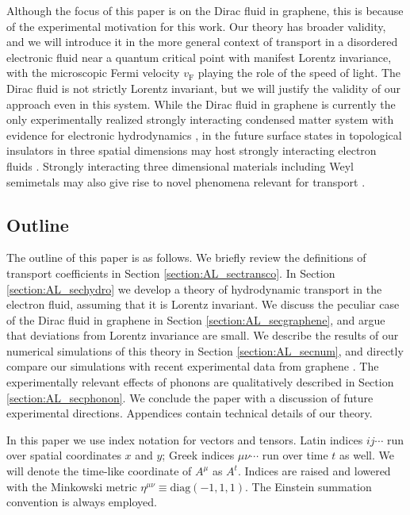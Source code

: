 Although the focus of this paper is on the Dirac fluid in graphene, this is because of the experimental motivation for this work.   Our theory has broader validity, and we will introduce it in the more general context of transport in a disordered electronic fluid near a quantum critical point with manifest Lorentz invariance, with the microscopic Fermi velocity $v_{\mathrm{F}}$ playing the role of the speed of light.  The Dirac fluid is not strictly Lorentz invariant, but we will justify the validity of our approach even in this system.   While the Dirac fluid in graphene is currently the only experimentally realized strongly interacting condensed matter system with evidence for electronic hydrodynamics \cite{crossno_observation_2016},  in the future surface states in topological insulators in three spatial dimensions  may host strongly interacting electron fluids \cite{efimkin_strongly_2014}.  Strongly interacting three dimensional materials including Weyl semimetals \cite{lu_experimental_2015, xu_discovery_2015, lv_experimental_2015} may also give rise to novel phenomena relevant for transport \cite{nielsen_adler-bell-jackiw_1983,son_chiral_2013}.

\subsection{Outline}
The outline of this paper is as follows.  We briefly review the definitions of transport coefficients in Section \ref{section:AL_sectransco}.   In Section \ref{section:AL_sechydro} we develop a theory of hydrodynamic transport in the electron fluid, assuming that it is Lorentz invariant.  We discuss the peculiar case of the Dirac fluid in graphene in Section \ref{section:AL_secgraphene}, and argue that deviations from Lorentz invariance are small.   We describe the results of our numerical simulations of this theory in Section \ref{section:AL_secnum}, and directly compare our simulations with recent experimental data from graphene \cite{crossno_observation_2016}.  The experimentally relevant effects of phonons are qualitatively described in Section \ref{section:AL_secphonon}.  We conclude the paper with a discussion of future experimental directions.   Appendices contain technical details of our theory.

In this paper we use index notation for vectors and tensors.  Latin indices $ij\cdots$ run over spatial coordinates $x$ and $y$;  Greek indices $\mu\nu\cdots$ run over time $t$ as well.   We will denote the time-like coordinate of $A^\mu$ as $A^t$.  Indices are raised and lowered with the Minkowski metric $\eta^{\mu\nu} \equiv \mathrm{diag}(-1,1,1)$.  The Einstein summation convention is always employed.

